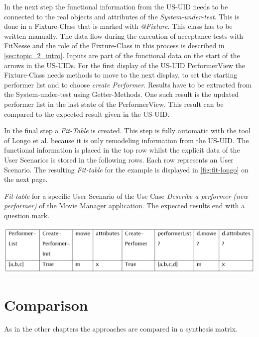 In the next step the functional information from the US-UID needs to be connected to the real
objects and attributes of the \textit{System-under-test}. This is done in a Fixture-Class that is marked
with \textit{@Fixture}.
This class has to be written manually.
The data flow during the execution of acceptance tests with FitNesse and the role of the Fixture-Class in this process is described in \autoref{sec:topic_2_intro}.
Inputs are part of the functional data on the start of the arrows in the US-UIDs. 
For the first display of the US-UID PerformerView the Fixture-Class needs methods to move to the next display, to set the starting performer list and to choose
\textit{create Performer}.
Results have to be extracted from the System-under-test using Getter-Methods.
One such result is the updated performer list in the last state of the PerformerView.
This result can be compared to the expected result given in the US-UID.

In the final step a \textit{Fit-Table} is created.
This step is fully automatic with the tool of Longo et al. because it is only remodeling information from the US-UID.
The functional information is placed in the top row whilst the explicit data of the User Scenarios is stored in the following rows.
Each row represents an User Scenario.
The resulting \textit{Fit-table} for the example is displayed in \autoref{fig:fit-longo} on the next page.

\begin{table}[h!]
	\caption{\textit{Fit-table} for a specific User Scenario of the Use Case \textit{Describe a performer (new performer)} of the Movie Manager application. The expected results end with a question mark.}
	\centering
	\includegraphics[width=\textwidth]{../images/LongoFit.png}

	
	\label{fig:fit-longo}
\end{table}

\newpage
\section{Comparison}
\label{sec:comparison}

As in the other chapters the approaches are compared in a synthesis matrix.

